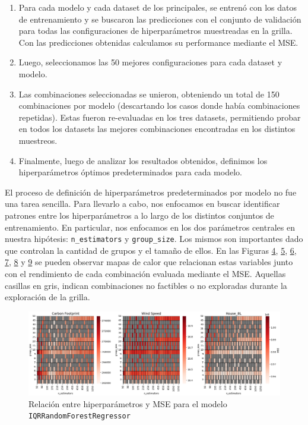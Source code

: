\begin{enumerate}
    \item Para cada modelo y cada dataset de los principales, se entrenó con los datos de entrenamiento y se buscaron las predicciones con el conjunto de validación para todas las configuraciones de hiperparámetros muestreadas en la grilla. Con las predicciones obtenidas calculamos su performance mediante el MSE.

    \item Luego, seleccionamos las 50 mejores configuraciones para cada dataset y modelo.
    
    \item Las combinaciones seleccionadas se unieron, obteniendo un total de 150 combinaciones por modelo (descartando los casos donde había combinaciones repetidas). Estas fueron re-evaluadas en los tres datasets, permitiendo probar en todos los datasets las mejores combinaciones encontradas en los distintos muestreos.
    
    \item Finalmente, luego de analizar los resultados obtenidos, definimos los hiperparámetros óptimos predeterminados para cada modelo.
\end{enumerate}

El proceso de definición de hiperparámetros predeterminados por modelo no fue una tarea sencilla. Para llevarlo a cabo, nos enfocamos en buscar identificar patrones entre los hiperparámetros a lo largo de los distintos conjuntos de entrenamiento. En particular, nos enfocamos en los dos parámetros centrales en nuestra hipótesis: \texttt{n\_estimators} y \texttt{group\_size}. Los mismos son importantes dado que controlan la cantidad de grupos y el tamaño de ellos. En las Figuras \hyperref[figure4]{4}, \hyperref[figure5]{5}, \hyperref[figure6]{6}, \hyperref[figure7]{7}, \hyperref[figure8]{8} y \hyperref[figure9]{9} se pueden observar mapas de calor que relacionan estas variables junto con el rendimiento de cada combinación evaluada mediante el MSE. Aquellas casillas en gris, indican combinaciones no factibles o no exploradas durante la exploración de la grilla.

\begin{figure}[h]
\centering
    \includegraphics[width=1\textwidth]{figures/marco-metodologico/heatmaps/heatmap_iqr.png}
\caption{Relación entre hiperparámetros y MSE para el modelo \texttt{IQRRandomForestRegressor}}
\end{figure}
\label{figure4}

